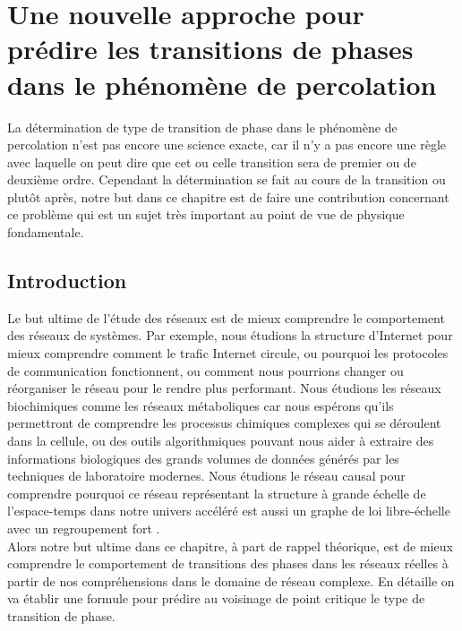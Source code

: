\newcommand{\kma}{\textless k_a \textgreater}
\newcommand{\kmaa}{\textless k_a^2 \textgreater}
\chapter{Une nouvelle approche pour prédire les transitions de phases dans le phénomène de percolation}

La détermination de type de transition de phase dans le phénomène de percolation n'est pas encore une science exacte, car il n'y a pas encore une règle avec laquelle on peut dire que cet ou celle transition sera de premier ou de deuxième ordre. Cependant la détermination se fait au cours de la transition ou plutôt après, notre but dans ce chapitre est de faire une contribution concernant ce problème qui est un sujet très important au point de vue de physique fondamentale.   

\section{Introduction}
Le but ultime de l'étude des réseaux est de mieux comprendre le comportement des réseaux de systèmes. Par exemple, nous étudions la structure d'Internet pour mieux comprendre comment le trafic Internet circule, ou pourquoi les protocoles de communication fonctionnent, ou comment nous pourrions changer ou réorganiser le réseau pour le rendre plus performant. Nous étudions les réseaux biochimiques comme les réseaux métaboliques car nous espérons qu'ils permettront de comprendre les processus chimiques complexes qui se déroulent dans la cellule, ou des outils algorithmiques pouvant nous aider à extraire des informations biologiques des grands volumes de données générés par les techniques de laboratoire modernes\cite{Newman2010}. Nous étudions le réseau causal pour comprendre pourquoi ce réseau représentant la structure à grande échelle de l'espace-temps dans notre univers accéléré est aussi un graphe de loi libre-échelle avec un regroupement fort \cite{Sungryong-Arjun2015}.\\
Alors notre but ultime dans ce chapitre, à part de rappel théorique, est de mieux comprendre le comportement de transitions des phases dans les réseaux réelles à partir
de nos compréhensions dans le domaine de réseau complexe. En détaille on va établir une formule pour prédire au voisinage de point critique le type de transition de phase.

